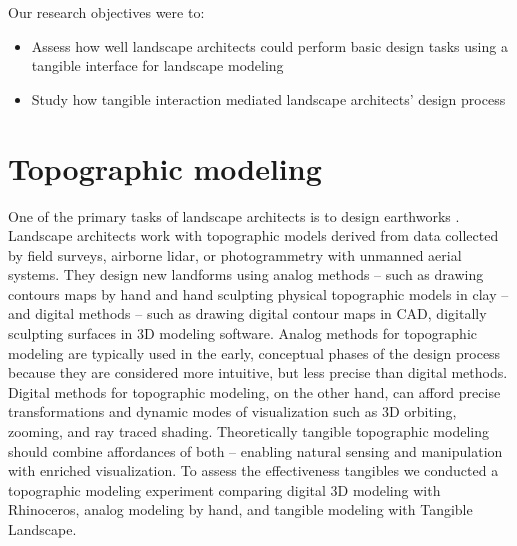\documentclass[Afour,sageh,times]{sagej}
\begin{document}
Our research objectives were to:
%
\begin{itemize}
\item Assess how well landscape architects could perform basic design tasks using
a tangible interface for landscape modeling
\item Study how tangible interaction mediated
landscape architects' design process
\end{itemize}

\clearpage


\section{Topographic modeling}
%
One of the primary tasks of landscape architects is to design earthworks
\cite{Petschek2008,Strom2013}. 
Landscape architects work with topographic models 
derived from data collected by field surveys, airborne lidar, 
or photogrammetry with unmanned aerial systems.
They design new landforms 
using analog methods -- such as 
drawing contours maps by hand and
hand sculpting physical topographic models in clay --
and digital methods -- such as 
drawing digital contour maps in CAD,
digitally sculpting surfaces in 3D modeling software. 
Analog methods for topographic modeling are typically used 
in the early, conceptual phases of the design process because 
they are considered more intuitive, but less precise than digital methods.
Digital methods for topographic modeling, on the other hand, 
can afford precise transformations and
dynamic modes of visualization such as 
3D orbiting, zooming, and ray traced shading.
Theoretically tangible topographic modeling 
should combine affordances of both -- 
enabling natural sensing and manipulation
with enriched visualization.
To assess the effectiveness tangibles
we conducted a topographic modeling experiment
comparing 
digital 3D modeling with Rhinoceros, 
analog modeling by hand, 
and tangible modeling with Tangible Landscape. 
\end{document}
